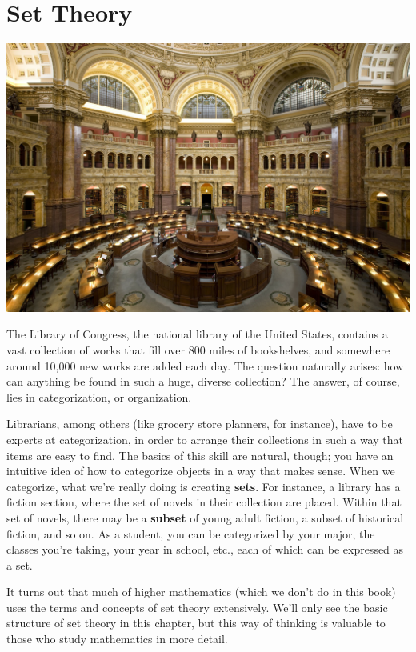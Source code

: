 \documentclass[9pt,letter,twoside,openright]{memoir}
\begin{document}
\chapter{Set Theory}
\begin{center}\includegraphics[width=\textwidth]{SetTheoryChapter1}\end{center}

The Library of Congress, the national library of the United States, contains a vast collection of works that fill over 800 miles of bookshelves, and somewhere around 10,000 new works are added each day.  The question naturally arises: how can anything be found in such a huge, diverse collection?  The answer, of course, lies in categorization, or organization.

Librarians, among others (like grocery store planners, for instance), have to be experts at categorization, in order to arrange their collections in such a way that items are easy to find.  The basics of this skill are natural, though; you have an intuitive idea of how to categorize objects in a way that makes sense.  When we categorize, what we're really doing is creating \textbf{sets}.  For instance, a library has a fiction section, where the set of novels in their collection are placed.  Within that set of novels, there may be a \textbf{subset} of young adult fiction, a subset of historical fiction, and so on.  As a student, you can be categorized by your major, the classes you're taking, your year in school, etc., each of which can be expressed as a set.

It turns out that much of higher mathematics (which we don't do in this book) uses the terms and concepts of set theory extensively.  We'll only see the basic structure of set theory in this chapter, but this way of thinking is valuable to those who study mathematics in more detail.
\end{document}
